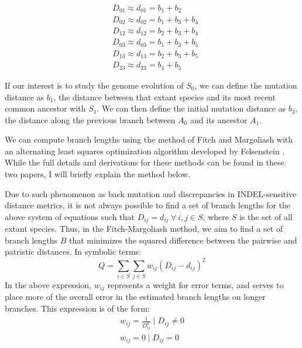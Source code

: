 \documentclass{article} %
\begin{document}
\begin{equation}
\begin{split}
&D_{01} \approx d_{01} = b_1 + b_2\\
&D_{02} \approx d_{02} = b_1 + b_3 + b_4\\
&D_{12} \approx d_{12} = b_2+b_3+b_4\\
&D_{03} \approx d_{03} = b_1+b_3+b_5\\
&D_{13} \approx d_{13} = b_2+b_3+b_5\\
&D_{23} \approx d_{23} = b_4+b_5
\end{split}
\end{equation}

If our interest is to study the genome evolution of $S_0$, we can define the mutation distance as $b_1$, the distance between that extant species and its most recent common ancestor with $S_1$. We can then define the initial mutation distance as $b_3$, the distance along the previous branch between $A_0$ and its ancestor $A_1$.\par
We can compute branch lengths using the method of Fitch and Margoliash \cite{pmid5334057} with an alternating least squares optimization algorithm developed by Felsenstein \cite{pmid11975348}. While the full details and derivations for these methods can be found in these two papers, I will briefly explain the method below.\par
Due to such phenomenon as back mutation and discrepancies in INDEL-sensitive distance metrics, it is not always possible to find a set of branch lengths for the above system of equations such that $D_{ij} = d_{ij} \: \forall \: i,j \in S$, where $S$ is the set of all extant species. Thus, in the Fitch-Margoliash method, we aim to find a set of branch lengths $B$ that minimizes the squared difference between the pairwise and patristic distances. In symbolic terms:
\begin{equation*}
	Q = \sum_{i \in S}\sum_{j \in S}w_{ij}(D_{ij} - d_{ij})^2
\end{equation*}
In the above expression, $w_{ij}$ represents a weight for error terms, and serves to place more of the overall error in the estimated branch lengths on longer branches. This expression is of the form:
\begin{equation*}
\begin{split}
	w_{ij} = \frac{1}{D_{ij}^2} \mid D_{ij} \ne 0\\
	w_{ij} = 0 \mid D_{ij} = 0
\end{split}
\end{equation*}
\end{document}
